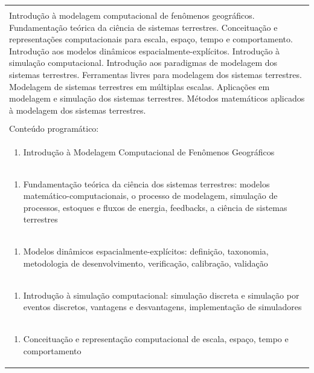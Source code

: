\documentclass[11pt]{article}
\begin{document}
\begin{center}
\begin{longtable}{|p{4cm}|p{4cm}|p{4cm}|p{4cm}|}
\multicolumn{4}{|p{16cm}|}{}\\
\multicolumn{4}{|p{\dimexpr 16cm + 6\tabcolsep\relax}|}{Introdução à modelagem computacional de fenômenos geográficos. Fundamentação teórica da ciência de sistemas terrestres. Conceituação e representações computacionais para escala, espaço, tempo e comportamento. Introdução aos modelos dinâmicos espacialmente-explícitos. Introdução à simulação computacional. Introdução aos paradigmas de modelagem dos sistemas terrestres. Ferramentas livres para modelagem dos sistemas terrestres. Modelagem de sistemas terrestres em múltiplas escalas. Aplicações em modelagem e simulação dos sistemas terrestres. Métodos matemáticos aplicados à modelagem dos sistemas terrestres.}\\
\multicolumn{4}{|p{16cm}|}{}\\
\hline
\multicolumn{4}{|p{16cm}|}{Conteúdo programático:}\\*
\multicolumn{4}{|p{\dimexpr 16cm + 6\tabcolsep\relax}|}{\begin{enumerate}[start=1]\item Introdução à Modelagem Computacional de Fenômenos Geográficos\end{enumerate}}\\
\multicolumn{4}{|p{\dimexpr 16cm + 6\tabcolsep\relax}|}{\begin{enumerate}[start=2]\item Fundamentação teórica da ciência dos sistemas terrestres: modelos matemático-computacionais, o processo de modelagem, simulação de processos, estoques e fluxos de energia, feedbacks, a ciência de sistemas terrestres\end{enumerate}}\\
\multicolumn{4}{|p{\dimexpr 16cm + 6\tabcolsep\relax}|}{\begin{enumerate}[start=3]\item Modelos dinâmicos espacialmente-explícitos: definição, taxonomia, metodologia de desenvolvimento, verificação, calibração, validação\end{enumerate}}\\
\multicolumn{4}{|p{\dimexpr 16cm + 6\tabcolsep\relax}|}{\begin{enumerate}[start=4]\item Introdução à simulação computacional: simulação discreta e simulação por eventos discretos, vantagens e desvantagens, implementação de simuladores\end{enumerate}}\\
\multicolumn{4}{|p{\dimexpr 16cm + 6\tabcolsep\relax}|}{\begin{enumerate}[start=5]\item Conceituação e representação computacional de escala, espaço, tempo e comportamento\end{enumerate}}\\

\end{longtable}
\end{center}
\end{document}

